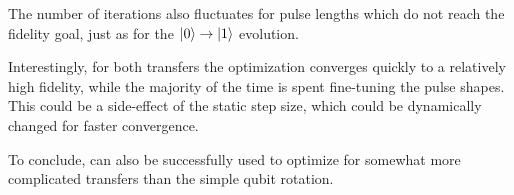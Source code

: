 \documentclass[main.tex]{subfiles}
\begin{document}
The number of iterations also fluctuates for pulse lengths which do not reach the fidelity goal, just as for the \(\ket{0}\rightarrow\ket{1}\) evolution.

Interestingly, for both transfers the optimization converges quickly to a relatively high fidelity, while the majority of the time is spent fine-tuning the pulse shapes.
This could be a side-effect of the static step size, which could be dynamically changed for faster convergence.

To conclude, \krotov{} can also be successfully used to optimize for somewhat more complicated transfers than the simple qubit rotation.
\end{document}
